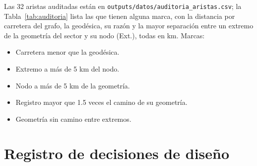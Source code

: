 \documentclass[12pt,a4paper]{article}
\begin{document}
Las 32 aristas auditadas están en \texttt{outputs/datos/auditoria\_aristas.csv}; la
Tabla~\ref{tab:auditoria} lista las que tienen alguna marca, con la distancia
por carretera del grafo, la geodésica, su razón y la mayor separación entre un
extremo de la geometría del sector y su nodo (Ext.), todas en km. Marcas:
\begin{itemize}
\item[A] Carretera menor que la geodésica.
\item[B] Extremo a más de 5 km del nodo.
\item[C] Nodo a más de 5 km de la geometría.
\item[D] Registro mayor que 1.5 veces el camino de su geometría.
\item[E] Geometría sin camino entre extremos.
\end{itemize}

\begin{table}[H]
\centering
\caption{Aristas marcadas por la auditoría geométrica}
\label{tab:auditoria}
\small\setlength{\tabcolsep}{3pt}


\end{table}

\section{Registro de decisiones de diseño}
\end{document}
